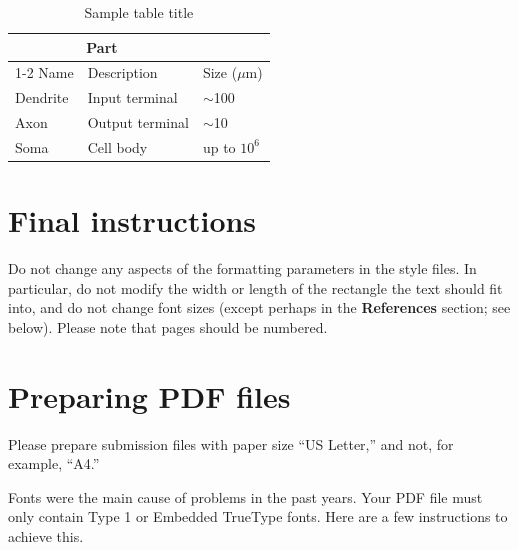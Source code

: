 \documentclass{article}
\begin{document}
\begin{table}
  \caption{Sample table title}
  \label{sample-table}
  \centering
  \begin{tabular}{lll}
    \toprule
    \multicolumn{2}{c}{Part}                   \\
    \cmidrule(r){1-2}
    Name     & Description     & Size ($\mu$m) \\
    \midrule
    Dendrite & Input terminal  & $\sim$100     \\
    Axon     & Output terminal & $\sim$10      \\
    Soma     & Cell body       & up to $10^6$  \\
    \bottomrule
  \end{tabular}
\end{table}

\section{Final instructions}

Do not change any aspects of the formatting parameters in the style
files.  In particular, do not modify the width or length of the
rectangle the text should fit into, and do not change font sizes
(except perhaps in the \textbf{References} section; see below). Please
note that pages should be numbered.

\section{Preparing PDF files}

Please prepare submission files with paper size ``US Letter,'' and
not, for example, ``A4.''

Fonts were the main cause of problems in the past years. Your PDF file
must only contain Type 1 or Embedded TrueType fonts. Here are a few
instructions to achieve this.
\end{document}
